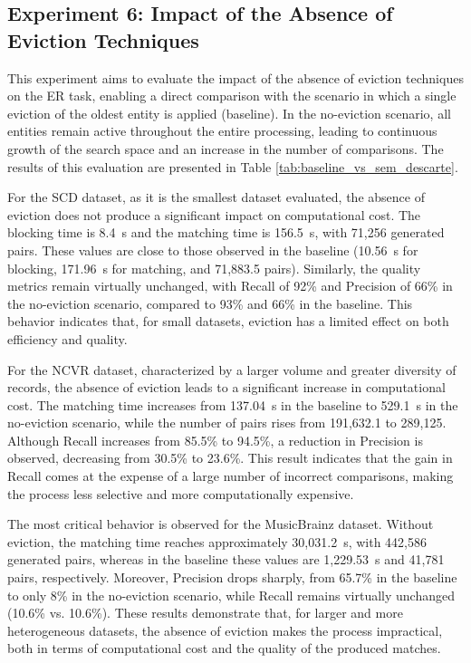 \documentclass{ieeeaccess}
\begin{document}
\subsection{Experiment 6: Impact of the Absence of Eviction Techniques} \label{exp6}

This experiment aims to evaluate the impact of the absence of eviction techniques on the ER task, enabling a direct comparison with the scenario in which a single eviction of the oldest entity is applied (baseline). In the no-eviction scenario, all entities remain active throughout the entire processing, leading to continuous growth of the search space and an increase in the number of comparisons. The results of this evaluation are presented in Table \ref{tab:baseline_vs_sem_descarte}.

For the SCD dataset, as it is the smallest dataset evaluated, the absence of eviction does not produce a significant impact on computational cost. The blocking time is 8.4~s and the matching time is 156.5~s, with 71,256 generated pairs. These values are close to those observed in the baseline (10.56~s for blocking, 171.96~s for matching, and 71,883.5 pairs). Similarly, the quality metrics remain virtually unchanged, with Recall of 92\% and Precision of 66\% in the no-eviction scenario, compared to 93\% and 66\% in the baseline. This behavior indicates that, for small datasets, eviction has a limited effect on both efficiency and quality.

For the NCVR dataset, characterized by a larger volume and greater diversity of records, the absence of eviction leads to a significant increase in computational cost. The matching time increases from 137.04~s in the baseline to 529.1~s in the no-eviction scenario, while the number of pairs rises from 191,632.1 to 289,125. Although Recall increases from 85.5\% to 94.5\%, a reduction in Precision is observed, decreasing from 30.5\% to 23.6\%. This result indicates that the gain in Recall comes at the expense of a large number of incorrect comparisons, making the process less selective and more computationally expensive.

The most critical behavior is observed for the MusicBrainz dataset. Without eviction, the matching time reaches approximately 30,031.2~s, with 442,586 generated pairs, whereas in the baseline these values are 1,229.53~s and 41,781 pairs, respectively. Moreover, Precision drops sharply, from 65.7\% in the baseline to only 8\% in the no-eviction scenario, while Recall remains virtually unchanged (10.6\% vs. 10.6\%). These results demonstrate that, for larger and more heterogeneous datasets, the absence of eviction makes the process impractical, both in terms of computational cost and the quality of the produced matches.
\end{document}
